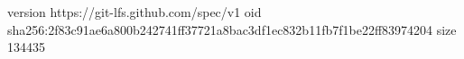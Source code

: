 version https://git-lfs.github.com/spec/v1
oid sha256:2f83c91ae6a800b242741ff37721a8bac3df1ec832b11fb7f1be22ff83974204
size 134435
